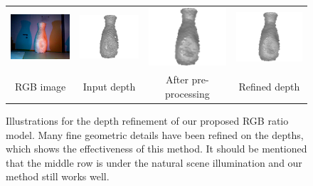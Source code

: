 \begin{figure}[!ht]
{\begin{tabular}{c|c c c}
   \includegraphics[height = 0.19\linewidth]{figures/methodology/ratio_vase_rgb.pdf}
   &
   \includegraphics[height = 0.19\linewidth]{figures/methodology/ratio_vase_shape_init.pdf} &
   \includegraphics[height = 0.19\linewidth]{figures/methodology/ratio_vase_shape_smooth.pdf} &
   \includegraphics[height = 0.19\linewidth]{figures/methodology/ratio_vase_shape.pdf} \\      {RGB image} & {Input depth} & {After pre-processing} &{Refined depth}                 
 \end{tabular}}
\caption{Illustrations for the depth refinement of our proposed RGB ratio model. Many fine geometric details have been refined on the depths, which shows the effectiveness of this method. It should be mentioned that the middle row is under the natural scene illumination and our method still works well.}
\label{fig:ratio_illustration}
\end{figure}



